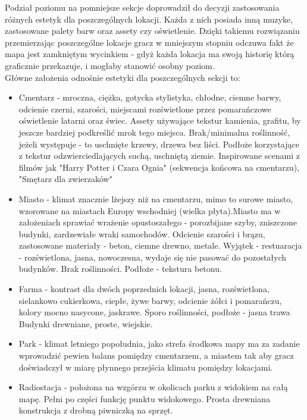 Podział poziomu na pomniejsze sekcje doprowadził do decyzji zastosowania różnych estetyk dla poszczególnych lokacji.
Każda z nich posiada inną muzyke, zastosowane palety barw oraz assety czy oświetlenie.
Dzięki takiemu rozwiązaniu przemierzając poszczególne lokacje gracz w mniejszym stopniu odczuwa fakt że mapa jest zamkniętym wycinkiem - gdyż każda lokacja ma swoją historię którą graficznie przekazuje, i mogłaby stanowić osobny poziom.\\
Główne założenia odnośnie estetyki dla poszczególnych sekcji to:
\begin{itemize}
    \item Cmentarz - mroczna, ciężka, gotycka stylistyka, chłodne, ciemne barwy, odcienie czerni, szarości, miejscami rozświetlone przez pomarańczowe oświetlenie latarni oraz świec.
    Assety używające tekstur kamienia, grafitu, by jeszcze bardziej podkreślić mrok tego miejsca.
    Brak/minimalna roślinność, jeżeli występuje - to uschnięte krzewy, drzewa bez liści.
    Podłoże korzystające z tekstur odzwierciedlających suchą, uschniętą ziemie.
    Inspirowane scenami z filmów jak "Harry Potter i Czara Ognia" (sekwencja końcowa na cmentarzu), "Smętarz dla zwierzaków"
    \item Miasto - klimat znacznie lżejszy niż na cmentarzu, mimo to surowe miasto, wzorowane na miastach Europy wschodniej (wielka płyta).Miasto ma w założeniach sprawiać wrażenie opustoszałego - porozbijane szyby, zniszczone budynki, zardzewiałe wraki samochodów.
    Odcienie szarości i brązu, zastosowane materiały - beton, ciemne drewno, metale.
    Wyjątek - restuaracja - rozświetlona, jasna, nowoczesna, wydaje się nie pasować do pozostałych budynków.
    Brak roślinności.
    Podłoże - tekstura betonu.
    \item Farma - kontrast dla dwóch poprzednich lokacji, jasna, rozświetlona, sielankowo cukierkowa, ciepłe, żywe barwy, odcienie żółci i pomarańczu, kolory mocno nasycone, jaskrawe.
    Sporo roślinności, podłoże - jasna trawa
    Budynki drewniane, proste, wiejskie.
    \item Park - klimat letniego popołudnia, jako strefa środkowa mapy ma za zadanie wprowadzić pewien balans pomiędzy cmentarzem, a miastem tak aby gracz doświadczył w miarę płynnego przejścia klimatu pomiędzy lokacjami. 
    \item Radiostacja - położona na wzgórzu w okolicach parku z widokiem na całą mapę. Pełni po części funkcję punktu widokowego. Prosta drewniana konstrukcja z drobną piwniczką na sprzęt.
\end{itemize}

